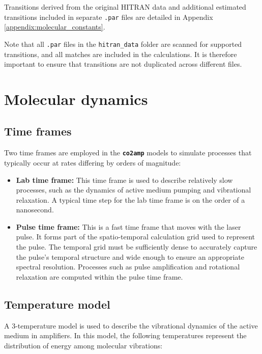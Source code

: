 Transitions derived from the original HITRAN data and additional estimated transitions included in separate \texttt{.par} files are detailed in Appendix \ref{appendix:molecular_constants}.

Note that all \texttt{.par} files in the \texttt{hitran\_data} folder are scanned for supported transitions, and all matches are included in the calculations. It is therefore important to ensure that transitions are not duplicated across different files.



\section{Molecular dynamics}

\subsection{Time frames}

Two time frames are employed in the \textbf{\texttt{co2amp}} models to simulate processes that typically occur at rates differing by orders of magnitude:

\begin{itemize}
    \item \textbf{Lab time frame:} This time frame is used to describe relatively slow processes, such as the dynamics of active medium pumping and vibrational relaxation. A typical time step for the lab time frame is on the order of a nanosecond.
    \item \textbf{Pulse time frame:} This is a fast time frame that moves with the laser pulse. It forms part of the spatio-temporal calculation grid used to represent the pulse. The temporal grid must be sufficiently dense to accurately capture the pulse's temporal structure and wide enough to ensure an appropriate spectral resolution. Processes such as pulse amplification and rotational relaxation are computed within the pulse time frame.
\end{itemize}




\subsection{Temperature model}

A 3-temperature model is used to describe the vibrational dynamics of the active medium in  amplifiers. In this model, the following temperatures represent the distribution of energy among molecular vibrations:

